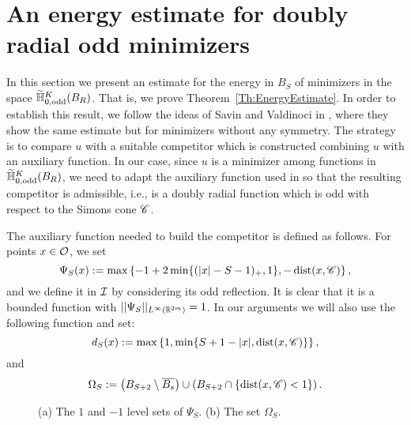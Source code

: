 \section{An energy estimate for doubly radial odd minimizers}
\label{Sec:EnergyEstimate}

In this section we present an estimate for the energy in $B_S$ of minimizers in the space $\widetilde{\mathbb{H}}^K_{0, \mathrm{odd}}(B_R)$. That is, we prove Theorem~\ref{Th:EnergyEstimate}. In order to establish this result, we follow the ideas of Savin and Valdinoci in \cite{SavinValdinoci-EnergyEstimate}, where they show the same estimate but for minimizers without any symmetry. The strategy is to compare $u$ with a suitable competitor which is constructed combining $u$ with an auxiliary function. In our case, since $u$ is a minimizer among functions in $\widetilde{\mathbb{H}}^K_{0, \mathrm{odd}}(B_R)$, we need to adapt the auxiliary function used in \cite{SavinValdinoci-EnergyEstimate} so that the resulting competitor is admissible, i.e., is a doubly radial function which is odd with  respect to the Simons cone $\mathscr{C}$.

The auxiliary function needed to build the competitor is defined as follows. For points $x\in \mathcal{O}$, we set
$$ \Psi_S(x) := \max\left\{-1+2\min\{(|x|-S-1)_+,1\},-\operatorname{dist}(x,\mathscr{C}) \right\},  $$
and we define it in $\mathcal{I}$ by considering its odd reflection. It is clear that it is a bounded function with $||\Psi_S||_{L^\infty(\mathbb{R}^{2m})}=1$. In our arguments we will also use the following function and set:
$$ d_S(x) := \max\left\{1,\min\{S+1-|x|,\operatorname{dist}(x,\mathscr{C})\} \right\},  $$
and
\begin{equation}
\label{Eq:DefOmegaS}
\Omega_S := \left( B_{S+2}\setminus \overline{B_s} \right) \cup \left( B_{S+2} \cap \{\operatorname{dist}(x,\mathscr{C})< 1\}\right).
\end{equation} 

\begin{figure}
	\centering
	\begin{subfigure}{0.49\textwidth}
		\centering
		
	\end{subfigure}
	\begin{subfigure}{0.49\textwidth}
		\centering
		
	\end{subfigure}
	\caption{(a) The $1$ and $-1$ level sets of $\Psi_S$. (b) The set $\Omega_S$.}
	\label{Fig:PsiSandOmegaS}
\end{figure}


